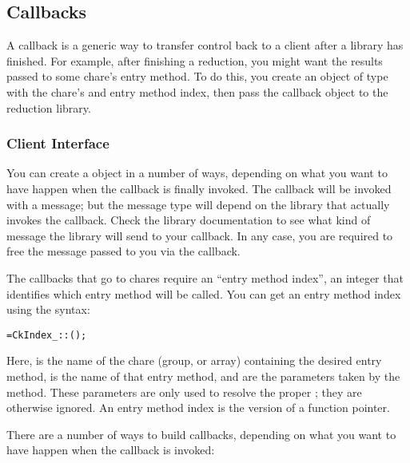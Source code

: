 \subsection{Callbacks}

\label{callbacks}

A callback is a generic way to transfer control back to a client
after a library has finished.  For example, after finishing a reduction,
you might want the results passed to some chare's entry method.
To do this, you create an object of type  with
the chare's  and entry method index, then pass the
callback object to the reduction library.


\subsubsection{Client Interface}


You can create a  object in a number of ways,
depending on what you want to have happen when the callback is
finally invoked.  The callback will be invoked with a \charmpp{}
message; but the message type will depend on the library that 
actually invokes the callback.  Check the library documentation
to see what kind of message the library will send to your callback.
In any case, you are required to free the message passed to you via
the callback.

The callbacks that go to chares require an ``entry method index'',
an integer that identifies which entry method will be called.
You can get an entry method index using the syntax:

\begin{alltt}
=CkIndex_::();
\end{alltt}

Here,  is the name of the chare (group, or array) containing
the desired entry method,  is the name of that entry method,
and  are the parameters taken by the method.
These parameters are only used to resolve the proper ;
they are otherwise ignored.  An entry method index is the \charmpp{}
version of a function pointer.


There are a number of ways to build callbacks, depending on what you
want to have happen when the callback is invoked:

